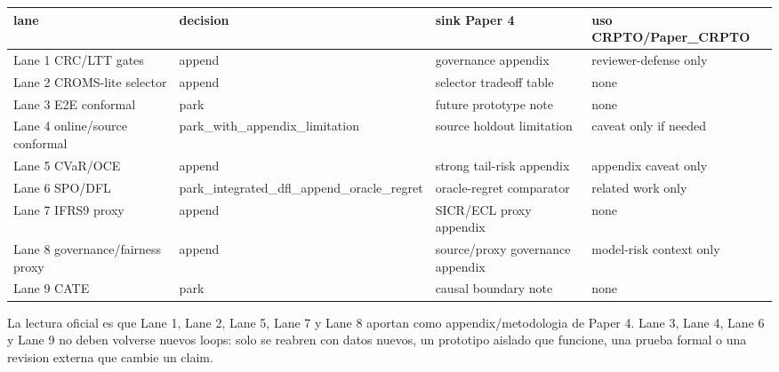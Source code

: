 \documentclass[
  spanish,
  11pt,
  letterpaper,
]{scrbook}
\newcounter{none} %
\theoremstyle{plain}
\theoremstyle{remark}
\begin{document}
{\def\LTcaptype{none} %
\begin{longtable}[]{@{}
  >{\raggedright\arraybackslash}p{}
  >{\raggedright\arraybackslash}p{}
  >{\raggedright\arraybackslash}p{}
  >{\raggedright\arraybackslash}p{}@{}}
\toprule\noalign{}
\begin{minipage}[b]{\linewidth}\raggedright
lane
\end{minipage} & \begin{minipage}[b]{\linewidth}\raggedright
decision
\end{minipage} & \begin{minipage}[b]{\linewidth}\raggedright
sink Paper 4
\end{minipage} & \begin{minipage}[b]{\linewidth}\raggedright
uso CRPTO/Paper\_CRPTO
\end{minipage} \\
\midrule\noalign{}
\endhead
\bottomrule\noalign{}
\endlastfoot
Lane 1 CRC/LTT gates & append & governance appendix & reviewer-defense
only \\
Lane 2 CROMS-lite selector & append & selector tradeoff table & none \\
Lane 3 E2E conformal & park & future prototype note & none \\
Lane 4 online/source conformal & park\_with\_appendix\_limitation &
source holdout limitation & caveat only if needed \\
Lane 5 CVaR/OCE & append & strong tail-risk appendix & appendix caveat
only \\
Lane 6 SPO/DFL & park\_integrated\_dfl\_append\_oracle\_regret &
oracle-regret comparator & related work only \\
Lane 7 IFRS9 proxy & append & SICR/ECL proxy appendix & none \\
Lane 8 governance/fairness proxy & append & source/proxy governance
appendix & model-risk context only \\
Lane 9 CATE & park & causal boundary note & none \\
\end{longtable}
}

La lectura oficial es que Lane 1, Lane 2, Lane 5, Lane 7 y Lane 8
aportan como appendix/metodologia de Paper 4. Lane 3, Lane 4, Lane 6 y
Lane 9 no deben volverse nuevos loops: solo se reabren con datos nuevos,
un prototipo aislado que funcione, una prueba formal o una revision
externa que cambie un claim.
\end{document}
